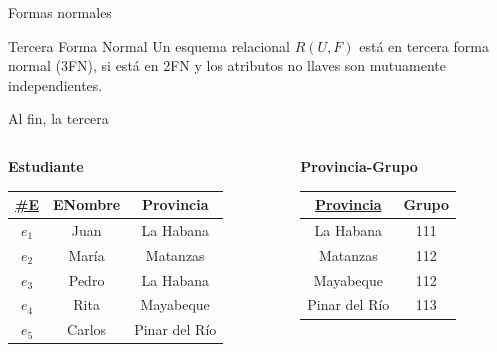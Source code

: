 \begin{frame}{Formas normales}
    \begin{block}{Tercera Forma Normal}
        Un esquema relacional $R(U,F)$ est\'a en tercera forma normal
        (3FN), si est\'a en 2FN y los atributos no llaves son mutuamente independientes.
        
    \end{block}
\end{frame}


\begin{frame}{Al fin, la tercera}
    \vspace{-3mm}
    \begin{columns}[T]
        \begin{column}{0.68\linewidth}
            \begin{columns}[T]
                \begin{column}{0.6\textwidth}
                    \begin{center}
                        \textbf{Estudiante}\\[2mm]
        
                        \begin{tabular}{ccc}
                            \underline{\#E} & ENombre & Provincia\\[1mm]
                            \hline
                            $e_1$ & Juan & La Habana\\
                            $e_2$ & Mar\'ia & Matanzas\\
                            $e_3$ & Pedro & La Habana\\
                            $e_4$ & Rita & Mayabeque\\
                            $e_5$ & Carlos & Pinar del R\'io
                        \end{tabular}
                    \end{center}
                \end{column}

                \begin{column}{0.4\textwidth}
                    \begin{center}
                        \textbf{Provincia-Grupo}\\[2mm]
        
                        \begin{tabular}{cc}
                            \underline{Provincia} & Grupo\\[1mm]
                            \hline
                            La Habana & 111\\
                            Matanzas & 112 \\
                            Mayabeque & 112 \\
                            Pinar del R\'io & 113
                            

\end{tabular}
\end{center}
\end{column}
\end{columns}
\end{column}
\end{columns}
\end{frame}
